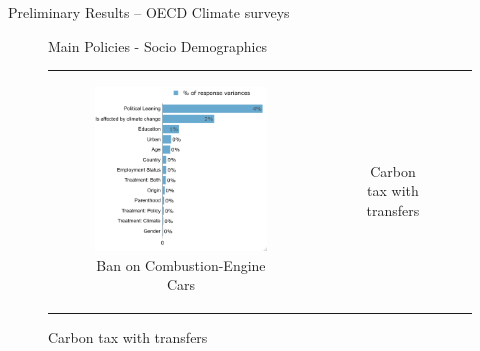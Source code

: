 \documentclass{article}
\begin{document}
\begin{LARGE}
	\begin{center}
		Preliminary Results – OECD Climate surveys	
	\end{center}
	
\end{LARGE}
	\tableofcontents
	\listoffigures

\clearpage


\begin{figure}[h!]
\begin{center}
	\caption{Main Policies - Socio Demographics}
	\caption*{Variance decomposition LMG}
	\setlength\extrarowheight{-1pt}
	\begin{tabular}{cc}
		\begin{subfigure}{0.5\textwidth}
		\caption{Ban on Combustion-Engine Cars}
			\includegraphics[width=\textwidth]{lmg_standard_socio_non_standardized}
		\end{subfigure}&
		\begin{subfigure}{0.5\textwidth}
		\caption{Carbon tax with transfers}

\end{subfigure}
\end{tabular}
\end{center}
\end{figure}
\end{document}
